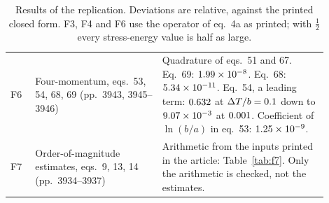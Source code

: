 \begin{table}[!htbp]
\begin{tabular}{>{\raggedright\arraybackslash}p{0.07\linewidth}>{\raggedright\arraybackslash}p{0.36\linewidth}>{\raggedright\arraybackslash}p{0.47\linewidth}}
F6 & Four-momentum, eqs.~53, 54, 68, 69 (pp.~3943, 3945--3946) & Quadrature of eqs.~51 and 67. Eq.~69: $1.99\times10^{-8}$. Eq.~68: $5.34\times10^{-11}$. Eq.~54, a leading term: $0.632$ at $\Delta T/b = 0.1$ down to $9.07\times10^{-3}$ at $0.001$. Coefficient of $\ln(b/a)$ in eq.~53: $1.25\times10^{-9}$. \\
F7 & Order-of-magnitude estimates, eqs.~9, 13, 14 (pp.~3934--3937) & Arithmetic from the inputs printed in the article: Table~\ref{tab:f7}. Only the arithmetic is checked, not the estimates. \\
\bottomrule
\end{tabular}
\caption{Results of the replication. Deviations are relative, against the printed closed form. F3, F4 and F6 use the operator of eq.~4a as printed; with $\tfrac12$ every stress-energy value is half as large.}
\label{tab:results}
\end{table}

